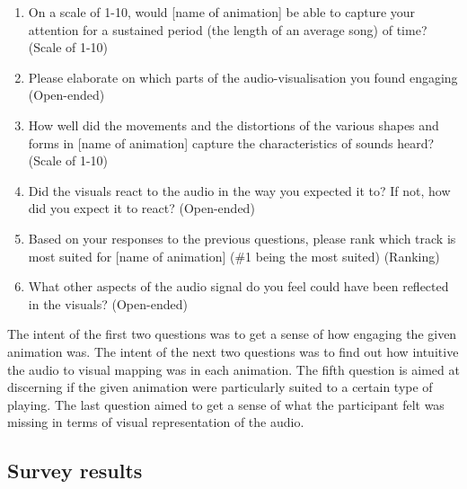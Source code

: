 \documentclass[../initial_thesis.tex]{subfiles}
\begin{document}
\begin{enumerate}
\item {On a scale of 1-10, would [name of animation] be able to capture your attention for a sustained period (the length of an average song) of time? (Scale of 1-10)}
\item {Please elaborate on which parts of the audio-visualisation you found engaging (Open-ended)}
\item {How well did the movements and the distortions of the various shapes and forms in [name of animation] capture the characteristics of sounds heard? (Scale of 1-10)}
\item {Did the visuals react to the audio in the way you expected it to? If not, how did you expect it to react? (Open-ended)}
\item {Based on your responses to the previous questions, please rank which track is most suited for [name of animation] (\#1 being the most suited) (Ranking)}
\item {What other aspects of the audio signal do you feel could have been reflected in the visuals? (Open-ended)}
\end{enumerate}

The intent of the first two questions was to get a sense of how engaging the given animation was. The intent of the next two questions was to find out how intuitive the audio to visual mapping was in each animation. The fifth question is aimed at discerning if the given animation were particularly suited to a certain type of playing. The last question aimed to get a sense of what the participant felt was missing in terms of visual representation of the audio.

\subsection{Survey results}
\end{document}
